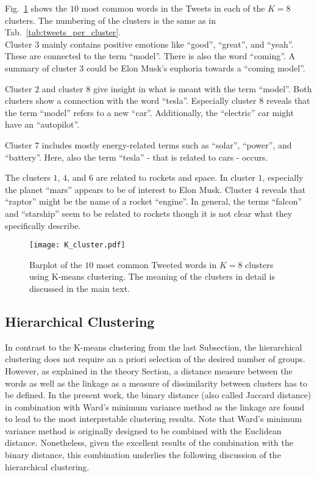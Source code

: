 Fig.~\ref{fig:K_cluster} shows the $10$ most common words in the Tweets in each of the $K=8$ clusters. The numbering of the clusters is the same as in Tab.~\ref{tab:tweets_per_cluster}. \\

Cluster $3$ mainly contains positive emotions like \enquote{good}, \enquote{great}, and \enquote{yeah}. These are connected to the term \enquote{model}. There is also the word \enquote{coming}. A summary of cluster $3$ could be Elon Musk's euphoria towards a \enquote{coming model}. 

Cluster $2$ and cluster $8$ give insight in what is meant with the term \enquote{model}. Both clusters show a connection with the word \enquote{tesla}. Especially cluster $8$ reveals that the term \enquote{model} refers to a new \enquote{car}. Additionally, the \enquote{electric} car might have an \enquote{autopilot}. 

Cluster $7$ includes mostly energy-related terms such as \enquote{solar}, \enquote{power}, and \enquote{battery}. Here, also the term \enquote{tesla} - that is related to cars - occurs. 

The clusters $1$, $4$, and $6$ are related to rockets and space. In cluster $1$, especially the planet \enquote{mars} appears to be of interest to Elon Musk. Cluster $4$ reveals that \enquote{raptor} might be the name of a rocket \enquote{engine}. In general, the terms \enquote{falcon} and \enquote{starship} seem to be related to rockets though it is not clear what they specifically describe.

\begin{figure}[h!]
\centering
\texttt{[image: K\_cluster.pdf]}
\caption{Barplot of the $10$ most common Tweeted words in $K=8$ clusters using K-means clustering. The meaning of the clusters in detail is discussed in the main text.}
\label{fig:K_cluster}
\end{figure}

\subsection{Hierarchical Clustering}

In contrast to the K-means clustering from the last Subsection, the hierarchical clustering does not require an a priori selection of the desired number of groups. However, as explained in the theory Section, a distance measure between the words as well as the linkage as a measure of dissimilarity between clusters has to be defined. In the present work, the binary distance (also called Jaccard distance) in combination with Ward's minimum variance method as the linkage are found to lead to the most interpretable clustering results. Note that Ward's minimum variance method is originally designed to be combined with the Euclidean distance. Nonetheless, given the excellent results of the combination with the binary distance, this combination underlies the following discussion of the hierarchical clustering.\\

